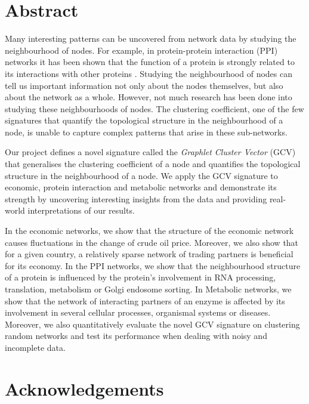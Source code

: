 \documentclass[11pt,a4paper,oneside]{book}
\theoremstyle{definition}
\theoremstyle{definition}
\theoremstyle{definition}
\begin{document}
\chapter*{Abstract}

Many interesting patterns can be uncovered from network data by studying the neighbourhood of nodes. For example, in protein-protein interaction (PPI) networks it has been shown that the function of a protein is strongly related to its interactions with other proteins \cite{schwikowski2000network}. Studying the neighbourhood of nodes can tell us important information not only about the nodes themselves, but also about the network as a whole. However, not much research has been done into studying these neighbourhoods of nodes. The clustering coefficient, one of the few signatures that quantify the topological structure in the neighbourhood of a node, is unable to capture complex patterns that arise in these sub-networks.

Our project defines a novel signature called the \emph{Graphlet Cluster Vector} (GCV) that generalises the clustering coefficient of a node and quantifies the topological structure in the neighbourhood of a node. We apply the GCV signature to economic, protein interaction and metabolic networks and demonstrate its strength by uncovering interesting insights from the data and providing real-world interpretations of our results. 

In the economic networks, we show that the structure of the economic network causes fluctuations in the change of crude oil price. Moreover, we also show that for a given country, a relatively sparse network of trading partners is beneficial for its economy. In the PPI networks, we show that the neighbourhood structure of a protein is influenced by the protein's involvement in RNA processing, translation, metabolism or Golgi endosome sorting. In Metabolic networks, we show that the network of interacting partners of an enzyme is affected by its involvement in several cellular processes, organismal systems or diseases. Moreover, we also quantitatively evaluate the novel GCV signature on clustering random networks and test its performance when dealing with noisy and incomplete data.



\chapter*{Acknowledgements}
\thispagestyle{empty}
\end{document}
